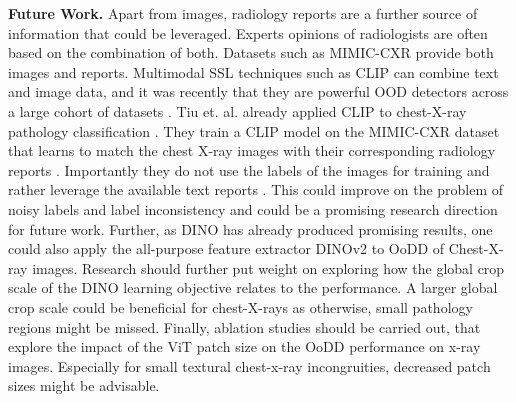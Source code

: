 \textbf{Future Work.}
Apart from images, radiology reports are a further source of information that could be leveraged. 
Experts opinions of radiologists are often based on the combination of both. 
Datasets such as MIMIC-CXR \citep{Johnson2019} provide both images and reports. 
Multimodal SSL techniques such as CLIP \citep{Radford2021} can combine text and image data, and it was recently that they are powerful OOD detectors across a large cohort of datasets \citep{Michels2023}.
Tiu et. al. already applied CLIP to chest-X-ray pathology classification \citep{Tiu2022}.
They train a CLIP model on the MIMIC-CXR dataset that learns to match the chest X-ray images with their corresponding radiology reports \citep{Tiu2022}.
Importantly they do not use the labels of the images for training and rather leverage the available text reports \citep{Tiu2022}.
This could improve on the problem of noisy labels and label inconsistency and could be a promising research direction for future work.
Further, as DINO has already produced promising results, one could also apply the all-purpose feature extractor DINOv2 \citep{Oquab2023} to OoDD of Chest-X-ray images. 
Research should further put weight on exploring how the global crop scale of the DINO learning objective relates to the performance.
A larger global crop scale could be beneficial for chest-X-rays as otherwise, small pathology regions might be missed.
Finally, ablation studies should be carried out, that explore the impact of the ViT patch size on the OoDD performance on x-ray images.
Especially for small textural chest-x-ray incongruities, decreased patch sizes might be advisable.